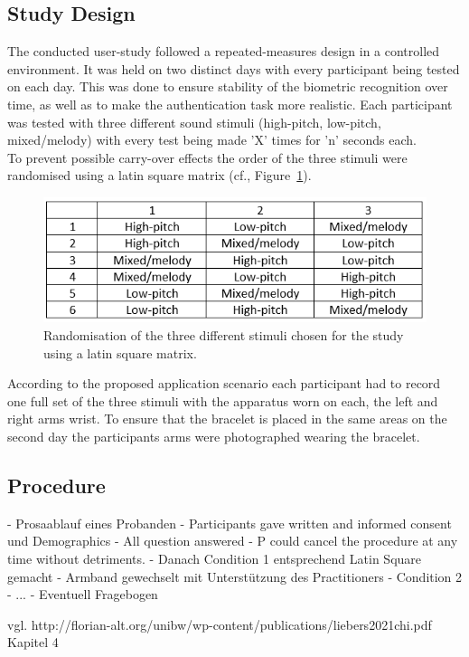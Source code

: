 \subsection{Study Design}
The conducted user-study followed a repeated-measures design in a controlled environment.
It was held on two distinct days with every participant being tested on each day.
This was done to ensure stability of the biometric recognition over time, as well as to make the authentication task more realistic.
Each participant was tested with three different sound stimuli (high-pitch, low-pitch, mixed/melody) with every test being made 'X' times for 'n' seconds each.\\
To prevent possible carry-over effects the order of the three stimuli were randomised using a latin square matrix (cf., Figure~\ref{fig:lat_square}).
\begin{figure}[H]
	\includegraphics[width=\linewidth]{Media/lat_square.png}
	\caption{Randomisation of the three different stimuli chosen for the study using a latin square matrix.}
	\label{fig:lat_square}
\end{figure}

According to the proposed application scenario each participant had to record one full set of the three stimuli with the apparatus worn on each, the left and right arms wrist.
To ensure that the bracelet is placed in the same areas on the second day the participants arms were photographed wearing the bracelet.

\subsection{Procedure}
- Prosaablauf eines Probanden
- Participants gave written and informed consent und Demographics
- All question answered
- P could cancel the procedure at any time without detriments.
- Danach Condition 1 entsprechend Latin Square gemacht
- Armband gewechselt mit Unterstützung des Practitioners
- Condition 2
- ...
- Eventuell Fragebogen

vgl. http://florian-alt.org/unibw/wp-content/publications/liebers2021chi.pdf Kapitel 4

